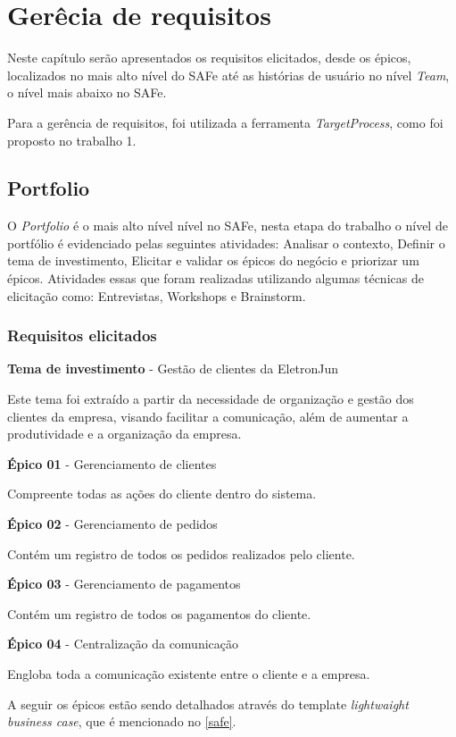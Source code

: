 \chapter{Gerêcia de requisitos}
Neste capítulo serão apresentados os requisitos elicitados, desde os épicos, localizados no mais alto nível do SAFe até as histórias de usuário no nível \textit{Team}, o nível mais abaixo no SAFe.

Para a gerência de requisitos, foi utilizada a ferramenta \textit{TargetProcess}, como foi proposto no trabalho 1.
\section{Portfolio}
O \textit{Portfolio} é o mais alto nível nível no SAFe, nesta etapa do trabalho o nível de portfólio é evidenciado pelas seguintes atividades: Analisar o contexto, Definir o tema de investimento, Elicitar e validar os épicos do negócio e priorizar um épicos. Atividades essas que foram realizadas utilizando algumas técnicas de elicitação como: Entrevistas, Workshops e Brainstorm.
\subsection{Requisitos elicitados}
\textbf{Tema de investimento} - Gestão de clientes da EletronJun

Este tema foi extraído a partir da necessidade de organização e gestão dos clientes da empresa, visando facilitar a comunicação, além de aumentar a produtividade e a organização da empresa.

\textbf{Épico 01} - Gerenciamento de clientes

Compreente todas as ações do cliente dentro do sistema.

\textbf{Épico 02} - Gerenciamento de pedidos

Contém um registro de todos os pedidos realizados pelo cliente.

\textbf{Épico 03} - Gerenciamento de pagamentos

Contém um registro de todos os pagamentos do cliente.

\textbf{Épico 04} - Centralização da comunicação

Engloba toda a comunicação existente entre o cliente e a empresa.

A seguir os épicos estão sendo detalhados através do template \textit{lightwaight business case}, que é mencionado no \ref{safe}.

